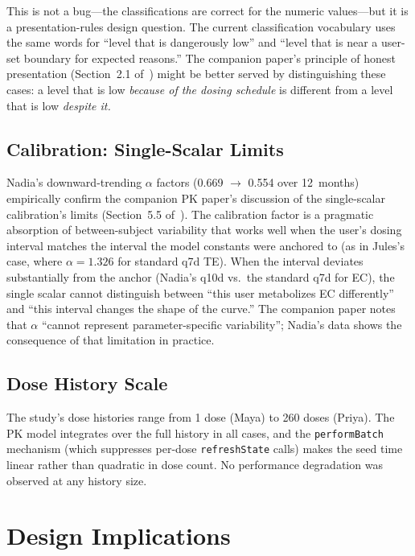 \documentclass[11pt,a4paper]{article}
\newcommand{\code}[1]{\texttt{\small #1}}
\begin{document}
This is not a bug---the classifications are correct for the numeric
values---but it is a presentation-rules design question. The current
classification vocabulary uses the same words for ``level that is
dangerously low'' and ``level that is near a user-set boundary for expected
reasons.'' The companion paper's principle of honest presentation
(Section~2.1 of~\cite{xtux}) might be better served by distinguishing these
cases: a level that is low \emph{because of the dosing schedule} is
different from a level that is low \emph{despite it.}

\subsection{Calibration: Single-Scalar Limits}

Nadia's downward-trending $\alpha$ factors (0.669 $\rightarrow$ 0.554 over
12~months) empirically confirm the companion PK paper's discussion of the
single-scalar calibration's limits (Section~5.5 of~\cite{xtpk}). The
calibration factor is a pragmatic absorption of between-subject variability
that works well when the user's dosing interval matches the interval the
model constants were anchored to (as in Jules's case, where $\alpha = 1.326$
for standard q7d TE). When the interval deviates substantially from the
anchor (Nadia's q10d vs.\ the standard q7d for EC), the single scalar cannot
distinguish between ``this user metabolizes EC differently'' and ``this
interval changes the shape of the curve.'' The companion paper notes that
$\alpha$ ``cannot represent parameter-specific variability''; Nadia's data
shows the consequence of that limitation in practice.

\subsection{Dose History Scale}

The study's dose histories range from 1 dose (Maya) to 260 doses (Priya).
The PK model integrates over the full history in all cases, and the
\code{performBatch} mechanism (which suppresses per-dose \code{refreshState}
calls) makes the seed time linear rather than quadratic in dose count. No
performance degradation was observed at any history size.

\section{Design Implications}
\label{sec:implications}
\end{document}
